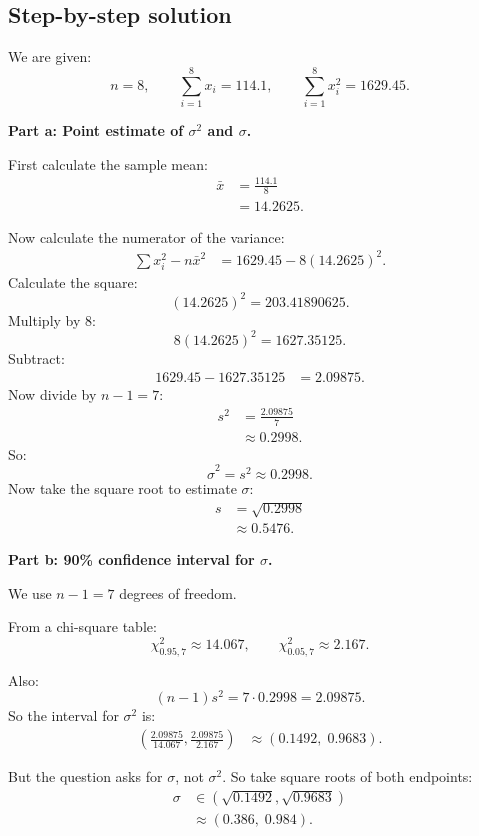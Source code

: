 \documentclass[11pt,a4paper]{article}
\begin{document}
\subsection*{Step-by-step solution}
We are given:
\[
n=8,\qquad \sum_{i=1}^8 x_i=114.1,\qquad \sum_{i=1}^8 x_i^2=1629.45.
\]

\textbf{Part a: Point estimate of \(\sigma^2\) and \(\sigma\).}

First calculate the sample mean:
\begin{align*}
\bar{x}
&=\frac{114.1}{8}\\
&=14.2625.
\end{align*}

Now calculate the numerator of the variance:
\begin{align*}
\sum x_i^2-n\bar{x}^2
&=1629.45-8(14.2625)^2.
\end{align*}
Calculate the square:
\[
(14.2625)^2=203.41890625.
\]
Multiply by \(8\):
\[
8(14.2625)^2=1627.35125.
\]
Subtract:
\begin{align*}
1629.45-1627.35125&=2.09875.
\end{align*}
Now divide by \(n-1=7\):
\begin{align*}
s^2
&=\frac{2.09875}{7}\\
&\approx 0.2998.
\end{align*}
So:
\[
\hat{\sigma}^2=s^2\approx 0.2998.
\]
Now take the square root to estimate \(\sigma\):
\begin{align*}
s
&=\sqrt{0.2998}\\
&\approx 0.5476.
\end{align*}

\textbf{Part b: 90\% confidence interval for \(\sigma\).}

We use \(n-1=7\) degrees of freedom.

From a chi-square table:
\[
\chi^2_{0.95,7}\approx 14.067,\qquad
\chi^2_{0.05,7}\approx 2.167.
\]

Also:
\[
(n-1)s^2=7\cdot 0.2998=2.09875.
\]
So the interval for \(\sigma^2\) is:
\begin{align*}
\left(
\frac{2.09875}{14.067},
\frac{2.09875}{2.167}
\right)
&\approx (0.1492,\;0.9683).
\end{align*}

But the question asks for \(\sigma\), not \(\sigma^2\). So take square roots of both endpoints:
\begin{align*}
\sigma
&\in \left(\sqrt{0.1492},\sqrt{0.9683}\right)\\
&\approx (0.386,\;0.984).
\end{align*}
\end{document}
